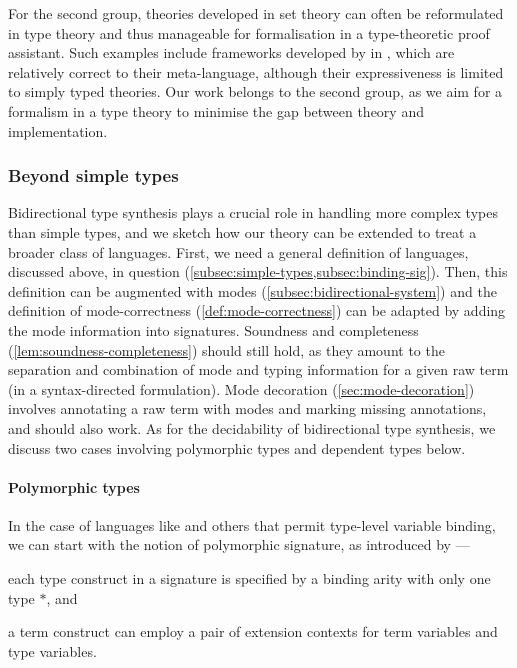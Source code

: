 For the second group, theories developed in set theory can often be reformulated in type theory and thus manageable for formalisation in a type-theoretic proof assistant. 
Such examples include frameworks developed by \citet{Allais2021,Ahrens2022,Fiore2022} in \Agda, which are relatively correct to their meta-language, although their expressiveness is limited to simply typed theories.
Our work belongs to the second group, as we aim for a formalism in a type theory to minimise the gap between theory and implementation.

\subsubsection{Beyond simple types}

Bidirectional type synthesis plays a crucial role in handling more complex types than simple types, and we sketch how our theory can be extended to treat a broader class of languages.
First, we need a general definition of languages, discussed above, in question (\cref{subsec:simple-types,subsec:binding-sig}).
Then, this definition can be augmented with modes (\cref{subsec:bidirectional-system}) and the definition of mode-correctness (\cref{def:mode-correctness}) can be adapted by adding the mode information into signatures.
Soundness and completeness (\cref{lem:soundness-completeness}) should still hold, as they amount to the separation and combination of mode and typing information for a given raw term (in a syntax-directed formulation).
Mode decoration (\cref{sec:mode-decoration}) involves annotating a raw term with modes and marking missing annotations, and should also work.
As for the decidability of bidirectional type synthesis, we discuss two cases involving polymorphic types and dependent types below.

\paragraph{Polymorphic types}
In the case of languages like \SystemF and others that permit type-level variable binding, we can start with the notion of polymorphic signature, as introduced by \citet{Hamana2011}---\begin{inlineenum}
  \item each type construct in a signature is specified by a binding arity with only one type $*$, and
  \item a term construct can employ a pair of extension contexts for term variables and type variables.
\end{inlineenum}

